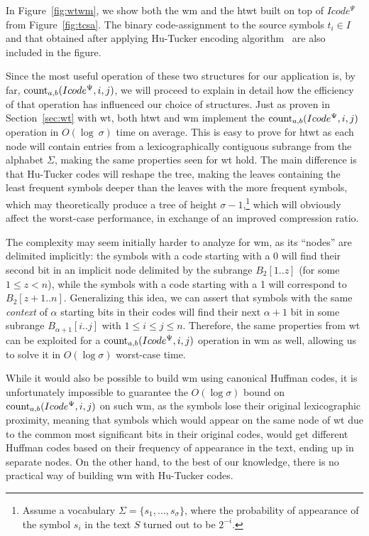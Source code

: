 	In Figure~\ref{fig:wtwm}, we show both the \gls{wm} and the \gls{htwt} built on top of $Icode^{\Psi}$ from Figure~\ref{fig:tcsa}.
	The binary code-assignment to the source symbols $t_i \in I$ and that obtained after applying Hu-Tucker encoding
	algorithm~\cite{hu1971optimal} are also included in the figure.
	
	Since the most useful operation of these two structures for our application is, by far, $\operatorname{count}_{a,b}(Icode^{\Psi},i,j)$, we will proceed to explain in detail how the efficiency of that operation has influenced our choice of structures. Just as proven in Section~\ref{sec:wt} with \gls{wt}, both \gls{htwt} and \gls{wm} implement the $\operatorname{count}_{a,b}(Icode^{\Psi},i,j)$ operation in $O(\log~\sigma)$ time on average. This is easy to prove for \gls{htwt} as each node will contain entries from a lexicographically contiguous subrange from the alphabet $\Sigma$, making the same properties seen for \gls{wt} hold. The main difference is that Hu-Tucker codes will reshape the tree, making the leaves containing the least frequent symbols deeper than the leaves with the more frequent symbols, which may theoretically produce a tree of height $\sigma-1$,\footnote{Assume a vocabulary $\Sigma=\{s_1,...,s_\sigma\}$, where the probability of appearance of the symbol $s_i$ in the text $S$ turned out to be $2^{-i}$.} which will obviously affect the worst-case performance, in exchange of an improved compression ratio.

	The complexity may seem initially harder to analyze for \gls{wm}, as its ``nodes'' are delimited implicitly: the symbols with a code starting with a 0 will find their second bit in an implicit node delimited by the subrange $B_2[1..z]$ (for some $1 \leq z < n$), while the symbols with a code starting with a 1 will correspond to $B_2[z+1..n]$. Generalizing this idea, we can assert that symbols with the same \textit{context} of $\alpha$ starting bits in their codes will find their next $\alpha+1$ bit in some subrange $B_{\alpha+1}[i..j]$ with $1 \leq i \leq j \leq n$. Therefore, the same properties from \gls{wt} can be exploited for a $\operatorname{count}_{a,b}(Icode^{\Psi},i,j)$ operation in \gls{wm} as well, allowing us to solve it in $O(\log\sigma)$ worst-case time.

	While it would also be possible to build \gls{wm} using canonical Huffman codes, it is unfortunately impossible to guarantee the $O(\log\sigma)$ bound on $\operatorname{count}_{a,b}(Icode^{\Psi},i,j)$ on such \gls{wm}, as the symbols lose their original lexicographic proximity, meaning that symbols which would appear on the same node of \gls{wt} due to the common most significant bits in their original codes, would get different Huffman codes based on their frequency of appearance in the text, ending up in separate nodes. On the other hand, to the best of our knowledge, there is no practical way of building \gls{wm} with Hu-Tucker codes.

